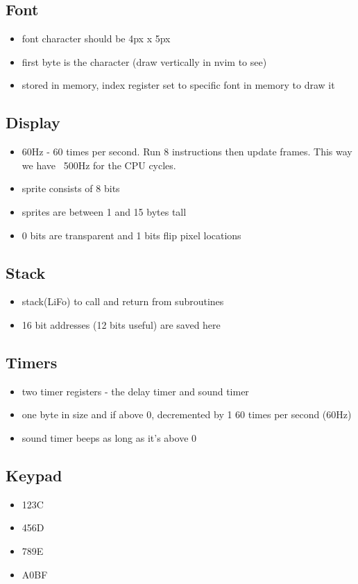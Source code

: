 \documentclass{article}
\begin{document}
\subsection*{Font}
\begin{itemize}
	\item font character should be 4px x 5px
	\item first byte is the character (draw vertically in nvim to see)
	\item stored in memory, index register set to specific font in memory to draw it
\end{itemize}
\subsection*{Display}
\begin{itemize}
	\item 60Hz - 60 times per second. Run 8 instructions then update frames. This way we have ~500Hz for the CPU cycles.
	\item sprite consists of 8 bits
	\item sprites are between 1 and 15 bytes tall
	\item 0 bits are transparent and 1 bits flip pixel locations
\end{itemize}
\subsection*{Stack}
\begin{itemize}
	\item stack(LiFo) to call and return from subroutines
	\item 16 bit addresses (12 bits useful) are saved here
\end{itemize}
\subsection*{Timers}
\begin{itemize}
	\item two timer registers - the delay timer and sound timer
	\item one byte in size and if above 0, decremented by 1 60 times per second (60Hz)
	\item sound timer beeps as long as it's above 0
\end{itemize}
\subsection*{Keypad}
\begin{itemize}
	\item 123C
	\item 456D
	\item 789E
	\item A0BF
\end{itemize}
\end{document}
